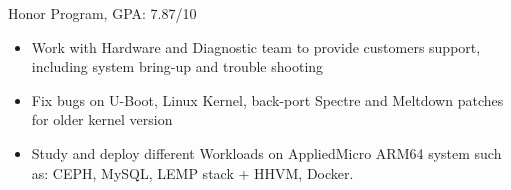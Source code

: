 \documentclass[12pt,a4paper]{altacv}
\begin{document}

\makecvheader

{
	Honor Program, GPA: 7.87/10
}

\begin{itemize}
\item Work with Hardware and Diagnostic team to provide customers support, including system bring-up and trouble shooting %
\item Fix bugs on U-Boot, Linux Kernel, back-port Spectre and Meltdown patches for older kernel version
\item Study and deploy different Workloads on AppliedMicro ARM64 system such as: CEPH, MySQL, LEMP stack + HHVM, Docker. %
\end{itemize}
\end{document}
